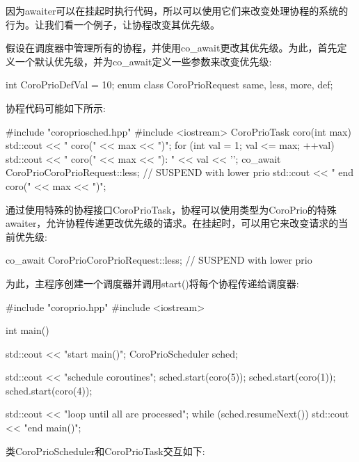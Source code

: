 因为awaiter可以在挂起时执行代码，所以可以使用它们来改变处理协程的系统的行为。让我们看一个例子，让协程改变其优先级。

假设在调度器中管理所有的协程，并使用co\_await更改其优先级。为此，首先定义一个默认优先级，并为co\_await定义一些参数来改变优先级:

\begin{cpp}
int CoroPrioDefVal = 10;
enum class CoroPrioRequest {same, less, more, def};
\end{cpp}

协程代码可能如下所示:


\begin{cpp}
#include "coropriosched.hpp"
#include <iostream>
CoroPrioTask coro(int max)
{
	std::cout << " coro(" << max << ")\n";
	for (int val = 1; val <= max; ++val) {
		std::cout << " coro(" << max << "): " << val << '\n';
		co_await CoroPrio{CoroPrioRequest::less}; // SUSPEND with lower prio
	}
	std::cout << " end coro(" << max << ")\n";
}
\end{cpp}

通过使用特殊的协程接口CoroPrioTask，协程可以使用类型为CoroPrio的特殊awaiter，允许协程传递更改优先级的请求。在挂起时，可以用它来改变请求的当前优先级:

\begin{cpp}
co_await CoroPrio{CoroPrioRequest::less}; // SUSPEND with lower prio
\end{cpp}

为此，主程序创建一个调度器并调用start()将每个协程传递给调度器:


\begin{cpp}
#include "coroprio.hpp"
#include <iostream>

int main()
{
	std::cout << "start main()\n";
	CoroPrioScheduler sched;

	std::cout << "schedule coroutines\n";
	sched.start(coro(5));
	sched.start(coro(1));
	sched.start(coro(4));

	std::cout << "loop until all are processed\n";
	while (sched.resumeNext()) {
	}
	std::cout << "end main()\n";
}
\end{cpp}

类CoroPrioScheduler和CoroPrioTask交互如下:

